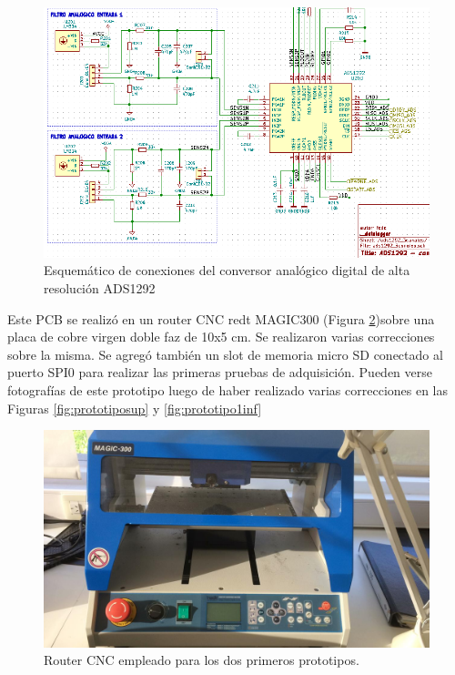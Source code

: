 \begin{figure}[!htbp]
	\centering
	
	\begin{minipage}{\textwidth}
		\includegraphics[width=\textwidth]{./Figures/ads1292_esq.png}		
	\end{minipage}		
	
	\caption{Esquemático de conexiones del conversor analógico digital de alta resolución ADS1292}
	\label{fig:ads1292esq}
\end{figure}



Este PCB se realizó en un router CNC redt MAGIC300 (Figura \ref{fig:magic300})sobre una placa de cobre virgen doble faz de 10x5 cm. Se realizaron varias correcciones sobre la misma. Se agregó también un slot de memoria micro SD conectado al puerto SPI0 para realizar las primeras pruebas de adquisición. Pueden verse fotografías de este prototipo luego de haber realizado varias correcciones en las Figuras \ref{fig:prototiposup} y \ref{fig:prototipo1inf}

\begin{figure}[!htbp]
	\centering
	
	\begin{minipage}{0.65\textwidth}
		\includegraphics[width=\textwidth]{./Figures/magic300.jpeg}		
	\end{minipage}		
	
	\caption{Router CNC empleado para los dos primeros prototipos.}
	\label{fig:magic300}
\end{figure}


